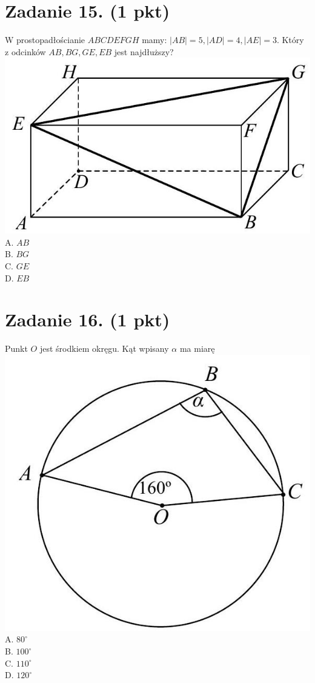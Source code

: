 \documentclass[10pt]{article}
\begin{document}
\section*{Zadanie 15. (1 pkt)}
W prostopadłościanie \(A B C D E F G H\) mamy: \(|A B|=5,|A D|=4,|A E|=3\). Który z odcinków \(A B, B G, G E, E B\) jest najdłuższy?\\
\includegraphics[max width=\textwidth, center]{2024_11_21_5b6b7ffa9006e3f448adg-06(1)}\\
A. \(A B\)\\
B. \(B G\)\\
C. \(G E\)\\
D. \(E B\)

\section*{Zadanie 16. (1 pkt)}
Punkt \(O\) jest środkiem okręgu. Kąt wpisany \(\alpha\) ma miarę\\
\includegraphics[max width=\textwidth, center]{2024_11_21_5b6b7ffa9006e3f448adg-06}\\
A. \(80^{\circ}\)\\
B. \(100^{\circ}\)\\
C. \(110^{\circ}\)\\
D. \(120^{\circ}\)
\end{document}
